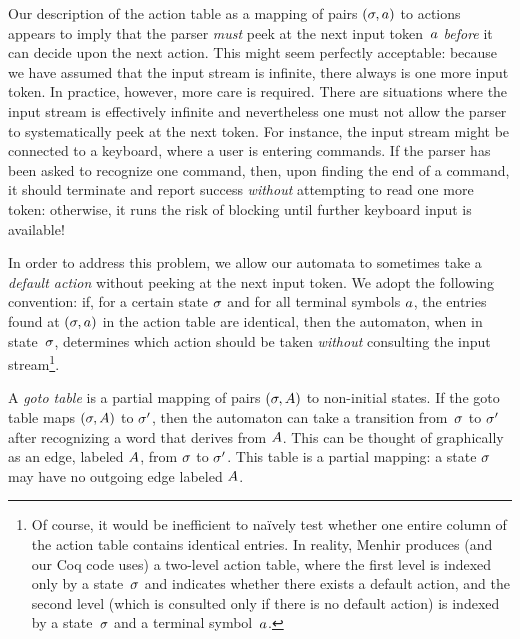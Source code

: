 \documentclass{llncs}
\begin{document}
\begin{remark}
\label{remark:default}
  Our description of the action table as a mapping of pairs $(\sigma, a)$
  to actions appears to imply that the parser \emph{must} peek at the next input
  token~$a$ \emph{before} it can decide upon the next action. This might
  seem perfectly acceptable: because we have assumed that the input stream is
  infinite, there always is one more input token. In practice, however, more
  care is required. There are situations where the input stream is effectively
  infinite and nevertheless one must not allow the parser to systematically
  peek at the next token. For instance, the input stream might be connected to
  a keyboard, where a user is entering commands. If the parser has been asked
  to recognize one command, then, upon finding the end of a command, it should
  terminate and report success \emph{without} attempting to read one more
  token: otherwise, it runs the risk of blocking until further keyboard input
  is available!

  In order to address this problem, we allow our automata to sometimes
  take a \emph{default action} without peeking at the next input
  token. We adopt the following convention: if, for a certain state $\sigma$
  and for all terminal symbols $a$, the entries found at $(\sigma,a)$
  in the action table are identical, then the automaton, when in
  state~$\sigma$, determines which action should be taken \emph{without}
  consulting the input stream\footnote{Of course, it would be inefficient to
  naïvely test whether one entire column of the action table contains
  identical entries. In reality, Menhir produces (and our Coq code
  uses) a two-level action table, where the first level is indexed only by a
  state~$\sigma$ and indicates whether there exists a default action, and the
  second level (which is consulted only if there is no default action) is
  indexed by a state~$\sigma$ and a terminal symbol~$a$.}.
\end{remark}

A \emph{goto table} is a partial mapping of pairs $(\sigma,A)$ to
non-initial states. If the goto table maps $(\sigma,A)$ to $\sigma'$,
then the automaton can take a transition from~$\sigma$ to $\sigma'$ after
recognizing a word that derives from $A$. This can be thought of
graphically as an edge, labeled $A$, from $\sigma$ to $\sigma'$. This
table is a partial mapping: a state $\sigma$ may have no outgoing edge labeled
$A$.
\end{document}
